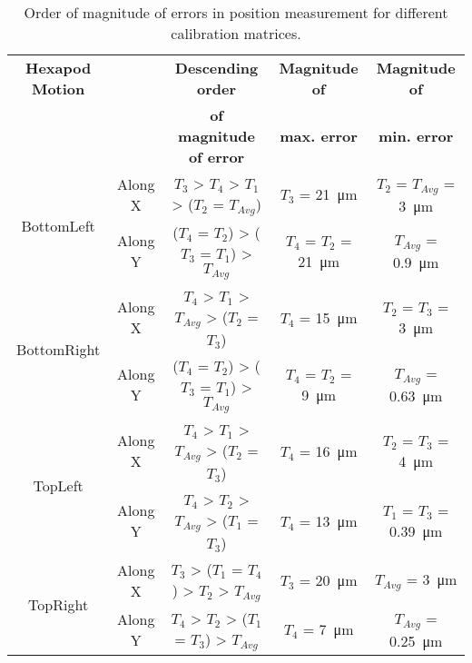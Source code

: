 \begin{table}[ht]
    \centering
    \footnotesize
    \begin{tabular}{ccccc}
            \toprule
            \textbf{Hexapod Motion} & & \textbf{Descending order} & \textbf{Magnitude of} & \textbf{Magnitude of} \\
            & & \textbf{of magnitude of error} & \textbf{max. error} & \textbf{min. error} \\
            \midrule
            
            \multirow{2}{*}{\textsf{BottomLeft}} & Along X & $T_3$ > $T_4$ > $T_1$ > ($T_2$ = $T_{Avg}$) & $T_3$ = \SI{21}{\micro\meter} & $T_2$ = $T_{Avg}$  = \SI{3}{\micro\meter} \\
            & Along Y & ($T_4$ = $T_2$) > ($T_3$ = $T_1$) > $T_{Avg}$ & $T_4$ = $T_2$ = \SI{21}{\micro\meter} & $T_{Avg}$ = \SI{0.9}{\micro\meter} \\
            
            \midrule
            
            \multirow{2}{*}{\textsf{BottomRight}} & Along X & $T_4$ > $T_1$ > $T_{Avg}$ > ($T_2$ = $T_3$) & $T_4$ = \SI{15}{\micro\meter} & $T_2$ = $T_3$  = \SI{3}{\micro\meter} \\
            & Along Y & ($T_4$ = $T_2$) > ($T_3$ = $T_1$) > $T_{Avg}$ & $T_4$ = $T_2$ = \SI{9}{\micro\meter} & $T_{Avg}$ = \SI{0.63}{\micro\meter} \\

            \midrule

            \multirow{2}{*}{\textsf{TopLeft}} & Along X & $T_4$ > $T_1$ > $T_{Avg}$ > ($T_2$ = $T_3$) & $T_4$ = \SI{16}{\micro\meter} & $T_2$ = $T_3$  = \SI{4}{\micro\meter} \\
            & Along Y & $T_4$ > $T_2$ > $T_{Avg}$ > ($T_1$ = $T_3$) & $T_4$ = \SI{13}{\micro\meter} & $T_1$ = $T_3$ = \SI{0.39}{\micro\meter} \\

            \midrule

            \multirow{2}{*}{\textsf{TopRight}} & Along X & $T_3$ > ($T_1$ = $T_4$) > $T_2$ > $T_{Avg}$ & $T_3$ = \SI{20}{\micro\meter} & $T_{Avg}$ = \SI{3}{\micro\meter} \\
            & Along Y & $T_4$ > $T_2$ > ($T_1$ = $T_3$) > $T_{Avg}$ & $T_4$ = \SI{7}{\micro\meter} & $T_{Avg}$ = \SI{0.25}{\micro\meter} \\
            
            \bottomrule
    \end{tabular}
    \caption{Order of magnitude of errors in position measurement for different calibration matrices.}
    \label{table:oom_calib_matrices}
\end{table}

